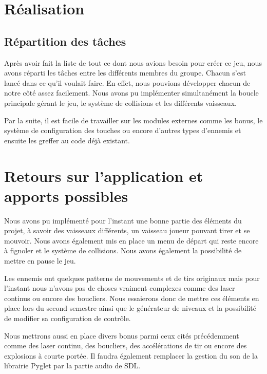 \documentclass[a4paper, 12pt]{report}
\begin{document}
\chapter{Réalisation}
\section{Répartition des tâches}

Après avoir fait la liste de tout ce dont nous avions besoin pour créer ce jeu,
nous avons réparti les tâches entre les différents membres du groupe. Chacun
s'est lancé dans ce qu'il voulait faire. En effet, nous pouvions développer
chacun de notre côté assez facilement. Nous avons pu implémenter simultanément
la boucle principale gérant le jeu, le système de collisions et les différents
vaisseaux.\newline

\noindent Par la suite, il est facile de travailler sur les modules externes
comme les bonus, le système de configuration des touches ou encore d'autres
types d'ennemis et ensuite les greffer au code déjà existant.

\chapter{Retours sur l'application et apports possibles}

Nous avons pu implémenté pour l'instant une bonne partie des éléments du
projet, à savoir des vaisseaux différents, un vaisseau joueur pouvant tirer et
se mouvoir. Nous avons également mis en place un menu de départ qui reste
encore à fignoler et le système de collisions. Nous avons également la
possibilité de mettre en pause le jeu. \newline

\noindent Les ennemis ont quelques patterns de mouvements et de tirs originaux
mais pour l'instant nous n'avons pas de choses vraiment complexes comme des
laser continus ou encore des boucliers. Nous essaierons donc de mettre ces
éléments en place lors du second semestre ainsi que le générateur de niveaux et
la possibilité de modifier sa configuration de contrôle. \newline

\noindent Nous mettrons aussi en place divers bonus parmi ceux cités
précédemment comme des laser continu, des boucliers, des accélérations de tir
ou encore des explosions à courte portée. Il faudra également remplacer la
gestion du son de la librairie Pyglet par la partie audio de SDL\@.
\end{document}
